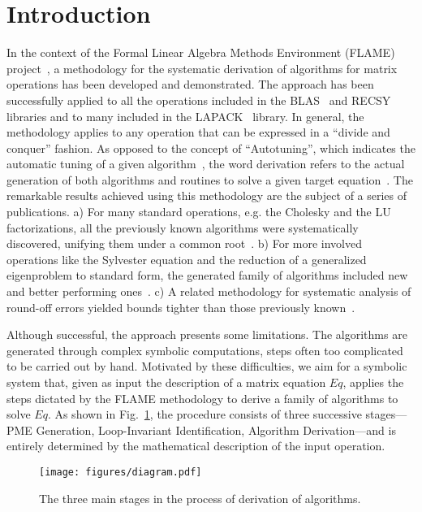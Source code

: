 \documentclass{llncs}
\begin{document}
\section{Introduction}

In the context of the Formal Linear Algebra Methods Environment
(FLAME) project~\cite{FLAMEOnline}, a methodology for the systematic
derivation of algorithms for matrix operations has been developed and
demonstrated. 
The approach has been successfully applied to all the 
operations included in the BLAS~\cite{level3BLAS} and 
RECSY~\cite{RECSY1,RECSY2} libraries and to
many included in the LAPACK~\cite{laug} library.
In general, the methodology
applies to any operation that can be expressed in a ``divide and
conquer'' fashion.
As opposed to the concept of ``Autotuning'', which
indicates the automatic tuning of a given
algorithm~\cite{atlas-sc98,FFTW05,Pueschel:05}, the word derivation refers to the
actual generation of both algorithms and routines to solve a given
target equation~\cite{Bientinesi:2005:SDD}.
The remarkable results achieved using this methodology are the 
subject of a series of publications. 
a) For many standard operations, e.g. the Cholesky and
the LU factorizations, all the previously known algorithms were systematically 
discovered, unifying them under a common root~\cite{FLAWN11}. 
b) For more involved operations like the Sylvester
equation and the reduction of a generalized eigenproblem to standard form,
the generated family of algorithms included new and better performing 
ones~\cite{Quintana-Orti:2003:FDA,FLAWN56}.
c) A related methodology for systematic analysis of round-off errors yielded bounds tighter than
those previously known~\cite{Paolo-MASA}.

Although successful, the approach presents some limitations. The
algorithms are generated through complex symbolic computations, steps
often too complicated to be carried out by hand. Motivated by these
difficulties, we aim for a symbolic system that, given as input the
description of a matrix equation $Eq$, applies the steps dictated by
the FLAME methodology to derive a family of algorithms to solve $Eq$.
As shown in Fig.~\ref{fig:steps}, the procedure
consists of three successive stages---PME Generation, Loop-Invariant Identification, Algorithm Derivation---and is entirely determined by the mathematical description of the input operation.

\begin{figure}
\centering
    \texttt{[image: figures/diagram.pdf]}
    \caption{The three main stages in the process of derivation of algorithms.} \label{fig:steps}
\end{figure}
\end{document}

